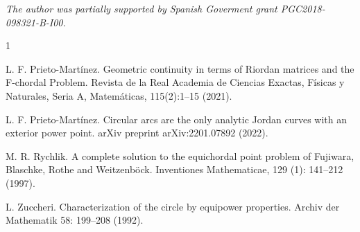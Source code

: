 \documentclass[a4paper]{amsart}
\begin{document}
\medskip







\emph{The author was partially supported by Spanish Goverment grant PGC2018-098321-B-I00.}







\begin{thebibliography}{1}

L. F. Prieto-Mart\'inez.
\newblock Geometric continuity in terms of Riordan matrices and the F-chordal Problem.
\newblock Revista de la Real Academia de Ciencias Exactas, Físicas y Naturales, Seria A, Matemáticas, 115(2):1--15 (2021). 

L. F. Prieto-Mart\'inez.
\newblock Circular arcs are the only analytic Jordan curves with an exterior power point.
\newblock arXiv preprint arXiv:2201.07892 (2022).


 M. R. Rychlik.
\newblock  A complete solution to the equichordal point problem of Fujiwara, Blaschke, Rothe and Weitzenb\"ock.
\newblock Inventiones Mathematicae, 129 (1): 141--212 (1997).

 L. Zuccheri.
\newblock Characterization of the circle by equipower properties.
\newblock Archiv der Mathematik 58: 199–208  (1992).






\end{thebibliography}
\end{document}
